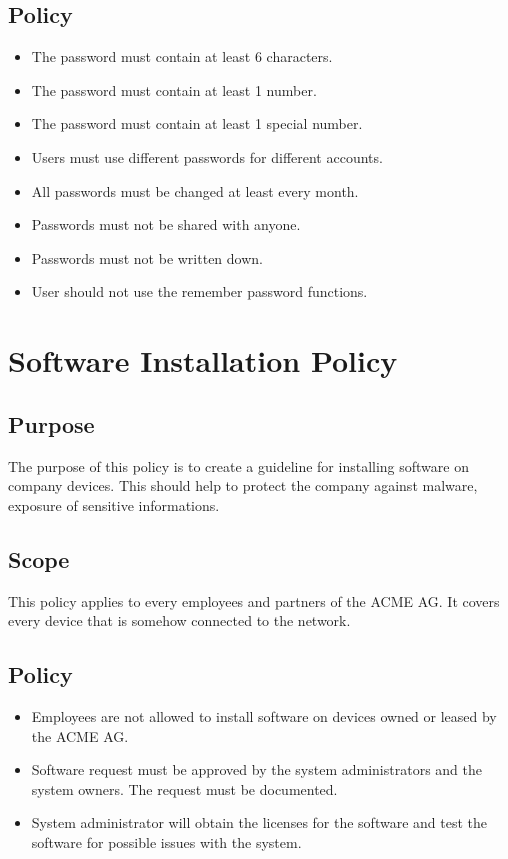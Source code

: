\section{Policy}
\begin{itemize}
\item The password must contain at least 6 characters. 
\item The password must contain at least 1 number.
\item The password must contain at least 1 special number.
\item Users must use different passwords for different accounts.
\item All passwords must be changed at least every month.
\item Passwords must not be shared with anyone.
\item Passwords must not be written down.
\item User should not use the remember password functions.
\end{itemize}
\chapter{Software Installation Policy}
\section{Purpose}
The purpose of this policy is to create a guideline for installing software on company devices. This should help to protect the company against malware, exposure of sensitive informations\cite{Sans}. 
\section{Scope}
This policy applies to every employees and partners of the ACME AG. It covers every device that is somehow connected to the network.
\section{Policy}
\begin{itemize}
\item Employees are not allowed to install software on devices owned or leased by the ACME AG.
\item Software request must be approved by the system administrators and the system owners. The request must be documented.
\item System administrator will obtain the licenses for the software and test the software for possible issues with the system.
\end{itemize}



